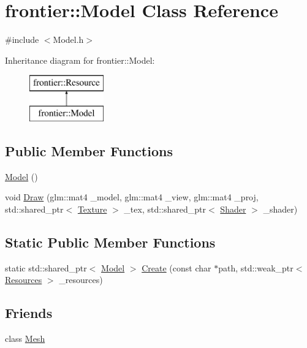 \hypertarget{classfrontier_1_1_model}{}\section{frontier\+:\+:Model Class Reference}
\label{classfrontier_1_1_model}


{\ttfamily \#include $<$Model.\+h$>$}

Inheritance diagram for frontier\+:\+:Model\+:\begin{figure}[H]
\begin{center}
\leavevmode
\includegraphics[height=2.000000cm]{classfrontier_1_1_model}
\end{center}
\end{figure}
\subsection*{Public Member Functions}
\begin{DoxyCompactItemize}
\item 
\hyperlink{classfrontier_1_1_model_a8285f56a5eff764d33adba7ba20b5a81}{Model} ()
\item 
void \hyperlink{classfrontier_1_1_model_ab969b8ae4c222ac60f347a5008b19bad}{Draw} (glm\+::mat4 \+\_\+model, glm\+::mat4 \+\_\+view, glm\+::mat4 \+\_\+proj, std\+::shared\+\_\+ptr$<$ \hyperlink{classfrontier_1_1_texture}{Texture} $>$ \+\_\+tex, std\+::shared\+\_\+ptr$<$ \hyperlink{classfrontier_1_1_shader}{Shader} $>$ \+\_\+shader)
\end{DoxyCompactItemize}
\subsection*{Static Public Member Functions}
\begin{DoxyCompactItemize}
\item 
static std\+::shared\+\_\+ptr$<$ \hyperlink{classfrontier_1_1_model}{Model} $>$ \hyperlink{classfrontier_1_1_model_abd0a135e820403384354644e5a348e84}{Create} (const char $\ast$path, std\+::weak\+\_\+ptr$<$ \hyperlink{classfrontier_1_1_resources}{Resources} $>$ \+\_\+resources)
\end{DoxyCompactItemize}
\subsection*{Friends}
\begin{DoxyCompactItemize}
\item 
class \hyperlink{classfrontier_1_1_model_aa41a130f156b145bffb3f4b5172c4c93}{Mesh}
\end{DoxyCompactItemize}
